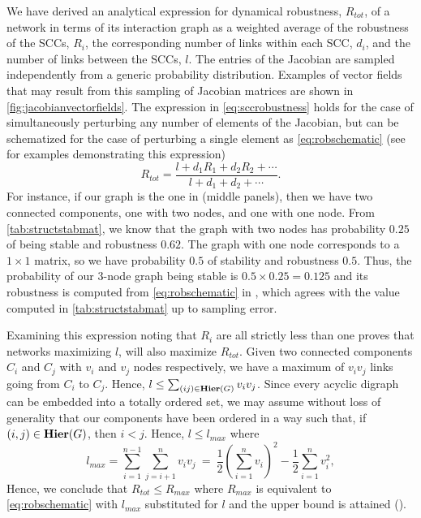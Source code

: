 We have derived an analytical expression for dynamical robustness, $R_{tot}$, of a network in terms of its interaction graph as a weighted average of the robustness of the SCCs, $R_i$, the corresponding number of links within each SCC, $d_i$, and the number of links between the SCCs, $l$. The entries of the Jacobian are sampled independently from a generic probability distribution. Examples of vector fields that may result from this sampling of Jacobian matrices are shown in \ref{fig:jacobianvectorfields}. The expression in \ref{eq:sccrobustness} holds for the case of simultaneously perturbing any number of elements of the Jacobian, but can be schematized for the case of perturbing a single element as \ref{eq:robschematic} (see $\,$ for examples demonstrating this expression)
\begin{equation}\label{eq:robschematic}
R_{tot} = \frac{l+d_1 R_1 + d_2 R_2 + \cdots}{l+d_1 + d_2 + \cdots}.
\end{equation}
For instance, if our graph is the one in  (middle panels), then we have two connected components, one with two nodes, and one with one node.  From \ref{tab:structstabmat}, we know that the graph with two nodes has probability $0.25$ of being stable and robustness $0.62$.  The graph with one node corresponds to a $1 \times 1$ matrix, so we have probability $0.5$ of stability and robustness $0.5$.  Thus, the probability of our 3-node graph being stable is $0.5 \times 0.25 = 0.125$ and its robustness is computed from \ref{eq:robschematic} in , which agrees with the value computed in \ref{tab:structstabmat} up to sampling error.

Examining this expression noting that $R_i$ are all strictly less than one proves that networks maximizing $l$, will also maximize $R_{tot}$.  Given two connected components $C_i$ and $C_j$ with $v_i$ and $v_j$ nodes respectively, we have a maximum of $v_i v_j$ links going from $C_i$ to $C_j$.  Hence, $l \le \sum_{(ij) \in \mathbf{Hier}(G)} v_i v_j$.  Since every acyclic digraph can be embedded into a totally ordered
set, we may assume without loss of generality that our components have
been ordered in a way such that, if $(i,j) \in \mathbf{Hier}(G)$, then $i <
j$.  Hence, $l \le l_{max}$ where
$$l_{max} = \sum_{i=1}^{n-1}\sum_{j=i+1}^{n}v_i
v_j~=~\frac{1}{2} \left( \sum_{i=1}^{n} v_i \right)^2-\frac{1}{2} \sum_{i=1}^{n}
v_i^2,$$
Hence, we conclude that $R_{tot} \le R_{max}$ where $R_{max}$ is equivalent to \ref{eq:robschematic} with $l_{max}$ substituted for $l$ and the upper bound is attained ().

